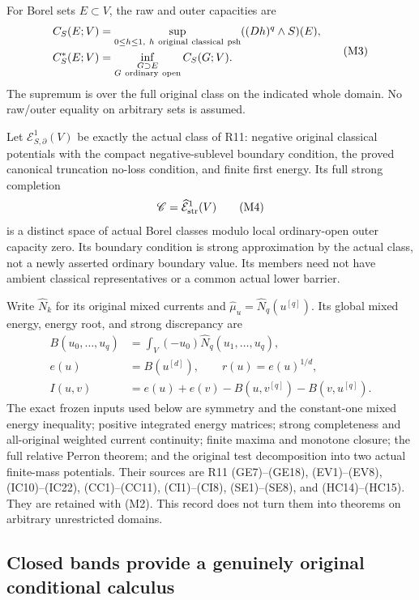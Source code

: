 \documentclass[11pt,a4paper]{article}
\numberwithin{equation}{section}
\theoremstyle{definition}
\theoremstyle{remark}
\begin{document}
For Borel sets $E\subset V$, the raw and outer capacities are
\[
 \begin{split}
 C_S(E;V)&=\sup_{0\leq h\leq1,\ h\ {\rm original\ classical\ psh}}
                       ((Dh)^q\wedge S)(E),\\
 C_S^*(E;V)&=\inf_{\substack{G\supset E\\G\ {\rm ordinary\ open}}}
                                                     C_S(G;V).
 \end{split}
 \tag{M3}
\]
The supremum is over the full original class on the indicated
whole domain. No raw/outer equality on arbitrary sets is assumed.

Let $\mathcal E^1_{S,\partial}(V)$ be exactly the actual class of
R11: negative original classical potentials with the compact
negative-sublevel boundary condition, the proved canonical
truncation no-loss condition, and finite first energy.
Its full strong completion
\[
                       \mathscr C=
                       \widehat{\mathcal E}^{1}_{\rm str}(V)
 \tag{M4}
\]
is a distinct space of actual Borel classes modulo local
ordinary-open outer capacity zero. Its boundary condition is
strong approximation by the actual class, not a newly asserted
ordinary boundary value. Its members need not have ambient
classical representatives or a common actual lower barrier.

Write $\widehat N_k$ for its original mixed currents and
$\widehat\mu_u=\widehat N_q(u^{[q]})$. Its global mixed energy,
energy root, and strong discrepancy are
\[
 \begin{split}
 B(u_0,\ldots,u_q)&=\int_V(-u_0)\widehat N_q(u_1,\ldots,u_q),\\
 e(u)&=B(u^{[d]}),\qquad r(u)=e(u)^{1/d},\\
 I(u,v)&=e(u)+e(v)-B(u,v^{[q]})-B(v,u^{[q]}).
 \end{split}
 \tag{M5}
\]
The exact frozen inputs used below are symmetry and the constant-one
mixed energy inequality; positive integrated energy matrices; strong
completeness and all-original weighted current continuity; finite
maxima and monotone closure; the full relative Perron theorem; and
the original test decomposition into two actual finite-mass
potentials. Their sources are R11 (GE7)--(GE18), (EV1)--(EV8),
(IC10)--(IC22), (CC1)--(CC11), (CI1)--(CI8), (SE1)--(SE8), and
(HC14)--(HC15). They are retained with (M2). This record does not
turn them into theorems on arbitrary unrestricted domains.

\subsection{Closed bands provide a genuinely original conditional calculus}
\end{document}
